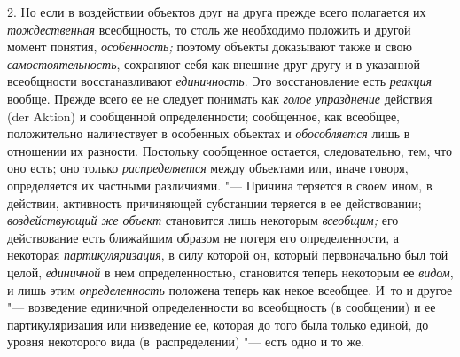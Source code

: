 2. Но если в воздействии объектов друг на друга прежде всего
полагается их {\em тождественная}
всеобщность, то столь же необходимо положить и другой момент
понятия, {\em особенность;}
поэтому объекты доказывают также и свою
{\em самостоятельность},
сохраняют себя как внешние друг другу и в указанной
всеобщности восстанавливают
{\em единичность}. Это
восстановление есть {\em реакция}
вообще. Прежде всего ее не следует понимать
как {\em голое упразднение}
действия (der Aktion) и сообщенной
определенности; сообщенное, как всеобщее, положительно наличествует в
особенных объектах и {\em обособляется}
лишь в отношении их разности. Постольку сообщенное остается,
следовательно, тем, что оно есть; оно только
{\em распределяется}
между объектами или, иначе говоря, определяется их частными
различиями. "--- Причина теряется в своем ином, в действии,
активность причиняющей субстанции теряется в ее действовании;
{\em воздействующий же объект}
становится лишь некоторым
{\em всеобщим;} его
действование есть ближайшим образом не потеря его определенности, а
некоторая {\em партикуляризация},
в силу которой он, который первоначально был той целой,
{\em единичной} в нем
определенностью, становится теперь некоторым ее
{\em видом}, и лишь этим
{\em определенность}
положена теперь как некое всеобщее. И~то и другое
"--- возведение единичной определенности во всеобщность (в
сообщении) и ее партикуляризация или низведение ее, которая до того была
только единой, до уровня некоторого вида (в~распределении)
"--- есть одно и то
же.

